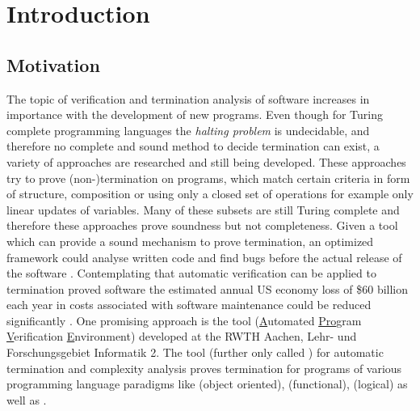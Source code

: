 \chapter{Introduction}

\section{Motivation}
\label{sec:aprove}
The topic of verification and termination analysis of software increases in importance with the development of new programs. Even though for Turing complete programming languages the \textit{halting problem} is undecidable, and therefore no complete and sound method to decide termination can exist, a variety of approaches are researched and still being developed. These approaches try to prove (non-)termination on programs, which match certain criteria in form of structure, composition or using only a closed set of operations for example only linear updates of variables. Many of these subsets are still Turing complete and therefore these approaches prove soundness but not completeness. \newline %
Given a tool which can provide a sound mechanism to prove termination, an optimized framework could analyse written code and find bugs before the actual release of the software \cite{verschaetse1993automatic}. Contemplating that automatic verification can be applied to termination proved software the estimated annual US economy loss of \$60 billion each year in costs associated with software maintenance could be reduced significantly \cite{zhivich2009real}. \newline
One promising approach is the tool \aprove (\underline{A}utomated \underline{Pro}gram \underline{V}erification \underline{E}nvironment) developed at the RWTH Aachen, Lehr- und Forschungsgebiet Informatik 2. The tool (further only called \aprove) for automatic termination and complexity analysis proves termination for programs of various programming language paradigms like  (object oriented),  (functional),  (logical) as well as .

